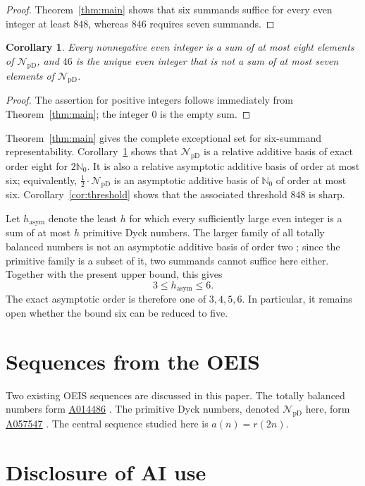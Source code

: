 \documentclass[12pt]{article}
\theoremstyle{plain}
\newtheorem{corollary}[theorem]{Corollary}
\newcommand{\NpD}{\mathcal{N}_{\mathrm{pD}}}
\newcommand{\seqnum}[1]{\href{https://oeis.org/#1}{\rm \underline{#1}}}
\begin{document}
\begin{proof}
Theorem~\ref{thm:main} shows that six summands suffice for every even
integer at least $848$, whereas $846$ requires seven summands.
\end{proof}

\begin{corollary}\label{cor:eight}
Every nonnegative even integer is a sum of at most eight elements of
$\NpD$, and $46$ is the unique even integer that is not a sum of at most
seven elements of $\NpD$.
\end{corollary}

\begin{proof}
The assertion for positive integers follows immediately from
Theorem~\ref{thm:main}; the integer $0$ is the empty sum.
\end{proof}

Theorem~\ref{thm:main} gives the complete exceptional set for
six-summand representability.  Corollary~\ref{cor:eight} shows that
$\NpD$ is a relative additive basis of exact order eight for
$2\mathbb N_0$.  It is also a relative asymptotic additive basis of
order at most six; equivalently, $\frac12\cdot\NpD$ is an asymptotic additive
basis of $\mathbb N_0$ of order at most six.  Corollary~\ref{cor:threshold}
shows that the associated threshold $848$ is sharp.

Let $h_{\mathrm{asym}}$ denote the least $h$ for which every sufficiently
large even integer is a sum of at most $h$ primitive Dyck numbers.  The
larger family of all totally balanced numbers is not an asymptotic
additive basis of order two \cite[Thm.~14]{BLS}; since the primitive
family is a subset of it, two summands cannot suffice here either.
Together with the present upper bound, this gives
\[
        3\leq h_{\mathrm{asym}}\leq6.
\]
The exact asymptotic order is therefore one of $3,4,5,6$.  In particular,
it remains open whether the bound six can be reduced to five.


\section{Sequences from the OEIS}\label{sec:oeis}

Two existing OEIS sequences are discussed in this paper.  The totally
balanced numbers form \seqnum{A014486} \cite{OEIS-A014486}.  The
primitive Dyck numbers, denoted $\NpD$ here, form \seqnum{A057547}
\cite{OEIS-A057547}.  The central sequence studied here is
$a(n)=r(2n)$.

\section{Disclosure of AI use}\label{sec:AI}
\end{document}
